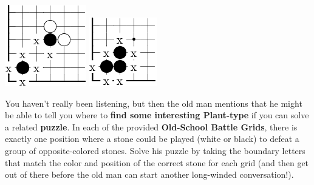 \begin{center}
  \includegraphics{gogetem/assets/explanation3-crop}
  \includegraphics{gogetem/assets/explanation4-crop}
\end{center}

You haven't really been listening, but then the old man mentions that he
might be able to tell you where to \textbf{find some interesting Plant-type
\mappMobimon{}} if you can solve a related \textbf{puzzle}.
In each of the provided \textbf{Old-School \mappMobimon{} Battle Grids},
there is exactly one position where a stone
could be played (white or black) to defeat a group of opposite-colored stones.
Solve his puzzle by taking the boundary letters
that match the color and position of the correct stone for each grid
(and then get out of there before the old man can start another long-winded
conversation!).


